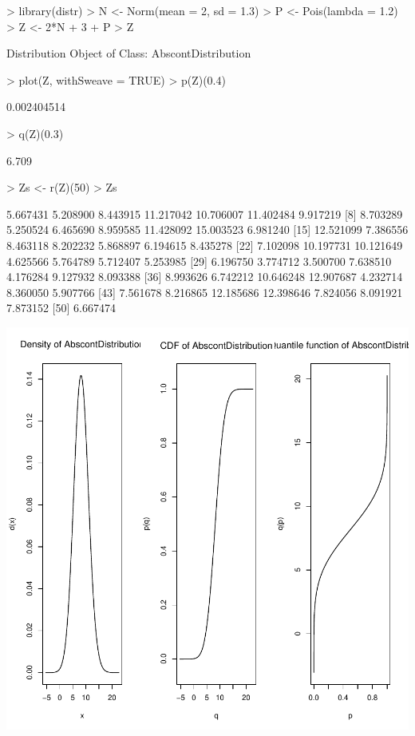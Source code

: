 \documentclass[11pt]{article}
\begin{document}
\begin{Schunk}
\begin{Sinput}
> library(distr)
> N <- Norm(mean = 2, sd = 1.3)
> P <- Pois(lambda = 1.2)
> Z <- 2*N + 3 + P
> Z
\end{Sinput}
\begin{Soutput}
Distribution Object of Class: AbscontDistribution
\end{Soutput}
\begin{Sinput}
> plot(Z, withSweave = TRUE)
> p(Z)(0.4)
\end{Sinput}
\begin{Soutput}
[1] 0.002404514
\end{Soutput}
\begin{Sinput}
> q(Z)(0.3)
\end{Sinput}
\begin{Soutput}
[1] 6.709
\end{Soutput}
\begin{Sinput}
> Zs <- r(Z)(50)
> Zs
\end{Sinput}
\begin{Soutput}
 [1]  5.667431  5.208900  8.443915 11.217042 10.706007 11.402484  9.917219
 [8]  8.703289  5.250524  6.465690  8.959585 11.428092 15.003523  6.981240
[15] 12.521099  7.386556  8.463118  8.202232  5.868897  6.194615  8.435278
[22]  7.102098 10.197731 10.121649  4.625566  5.764789  5.712407  5.253985
[29]  6.196750  3.774712  3.500700  7.638510  4.176284  9.127932  8.093388
[36]  8.993626  6.742212 10.646248 12.907687  4.232714  8.360050  5.907766
[43]  7.561678  8.216865 12.185686 12.398646  7.824056  8.091921  7.873152
[50]  6.667474
\end{Soutput}
\end{Schunk}
\includegraphics{distr-exam1}
\end{document}
